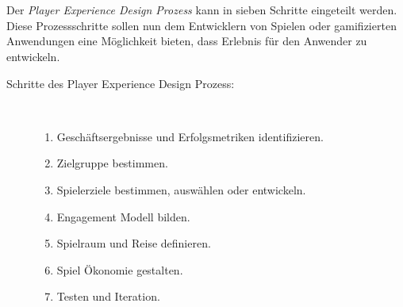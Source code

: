 \documentclass[a4paper,12pt]{scrartcl}
\begin{document}
\\\\
Der \textit{Player Experience Design Prozess} kann in sieben Schritte eingeteilt werden. Diese Prozessschritte sollen nun dem Entwicklern von Spielen oder gamifizierten Anwendungen eine Möglichkeit bieten, dass Erlebnis für den Anwender zu entwickeln.
\begin{description}
   \item[Schritte des Player Experience Design Prozess:]~\par
   \begin{enumerate}
      \item Geschäftsergebnisse und Erfolgsmetriken identifizieren.
      \item Zielgruppe bestimmen.
      \item Spielerziele bestimmen, auswählen oder entwickeln.
      \item Engagement Modell bilden.
      \item Spielraum und Reise definieren.
      \item Spiel Ökonomie gestalten.
      \item Testen und Iteration.
   \end{enumerate}
\end{description}
\end{document}
